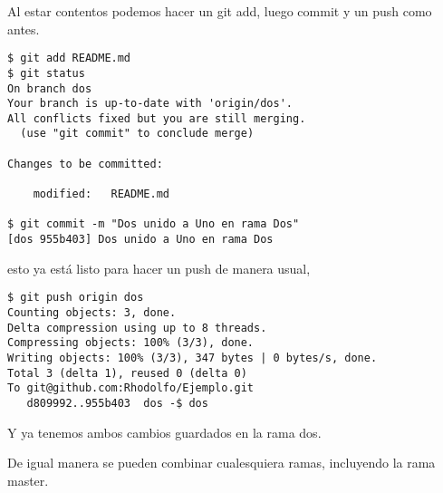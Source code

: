 \documentclass{article}
\begin{document}
Al estar contentos podemos hacer un git add, luego commit y un push como antes.
\begin{verbatim}
$ git add README.md 
$ git status
On branch dos
Your branch is up-to-date with 'origin/dos'.
All conflicts fixed but you are still merging.
  (use "git commit" to conclude merge)

Changes to be committed:

	modified:   README.md

$ git commit -m "Dos unido a Uno en rama Dos" 
[dos 955b403] Dos unido a Uno en rama Dos
\end{verbatim}
esto ya est\'{a} listo para hacer un push de manera usual,
\begin{verbatim}
$ git push origin dos
Counting objects: 3, done.
Delta compression using up to 8 threads.
Compressing objects: 100% (3/3), done.
Writing objects: 100% (3/3), 347 bytes | 0 bytes/s, done.
Total 3 (delta 1), reused 0 (delta 0)
To git@github.com:Rhodolfo/Ejemplo.git
   d809992..955b403  dos -$ dos
\end{verbatim}
Y ya tenemos ambos cambios guardados en la rama dos.

De igual manera se pueden combinar cualesquiera ramas, incluyendo la rama master.
\end{document}
